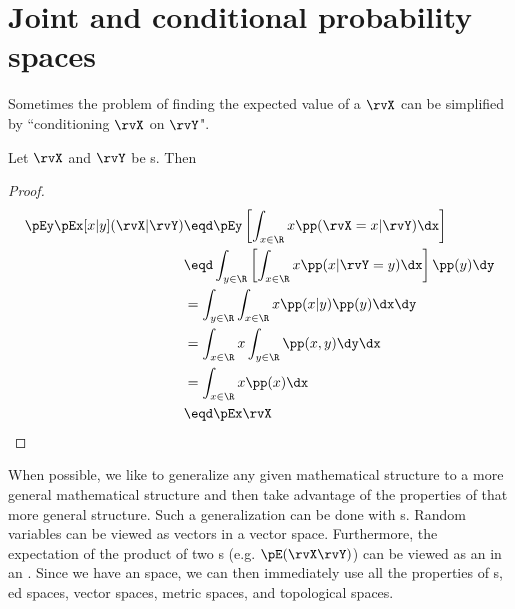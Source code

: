 \section{Joint and conditional probability spaces}
Sometimes the problem of finding the expected value of a  $\rvX$
can be simplified by ``conditioning $\rvX$ on $\rvY$".
\begin{theorem}
Let $\rvX$ and $\rvY$ be s. Then
\thmbox{\pEx{\rvX} = \pEy\pEx[x|y](\rvX|\rvY) }
\end{theorem}
\begin{proof}
\begin{align*}
   \pEy\pEx[x|y](\rvX|\rvY)
     &\eqd \pEy \left[ \int_{x\in\R}x \pp(\rvX=x|\rvY) \dx \right]
   \\&\eqd \int_{y\in\R} \left[\int_{x\in\R}x \pp(x|\rvY=y) \dx \right] \pp(y) \dy
   \\&=    \int_{y\in\R} \int_{x\in\R}x \pp(x|y)\pp(y) \dx   \dy
   \\&=    \int_{x\in\R}x \int_{y\in\R} \pp(x,y) \dy   \dx
   \\&=    \int_{x\in\R}x \pp(x) \dx
   \\&\eqd \pEx\rvX
\end{align*}
\end{proof}

When possible, we like to generalize any given mathematical structure
to a more general mathematical structure and then take advantage of
the properties of that more general structure.
Such a generalization can be done with s.
Random variables can be viewed as vectors in a vector space.
Furthermore, the expectation of the product of two s
(e.g. $\pE(\rvX\rvY)$)
can be viewed as an  in an .
Since we have an  space,
we can then immediately use all the properties of
s, ed spaces, vector spaces, metric spaces,
and topological spaces.

